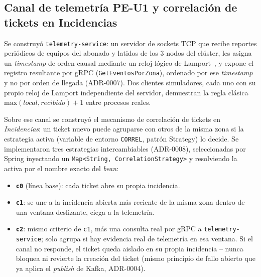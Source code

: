 \subsection{Canal de telemetría PE-U1 y correlación de tickets en Incidencias}
\label{sec:pe-u1-correl}

Se construyó \texttt{telemetry-service}: un servidor de sockets TCP que recibe reportes
periódicos de equipos del abonado y latidos de los 3 nodos del clúster, les asigna un
\emph{timestamp} de orden causal mediante un reloj lógico de Lamport~\cite{lamport1978time}, y
expone el registro resultante por gRPC (\texttt{GetEventosPorZona}), ordenado por ese
\emph{timestamp} y no por orden de llegada (ADR-0007). Dos clientes simuladores, cada uno con su
propio reloj de Lamport independiente del servidor, demuestran la regla clásica
$\text{max}(local, recibido) + 1$ entre procesos reales.

Sobre ese canal se construyó el mecanismo de correlación de tickets en \emph{Incidencias}: un
ticket nuevo puede agruparse con otros de la misma zona si la estrategia activa (variable de
entorno \texttt{CORREL}, patrón Strategy) lo decide. Se implementaron tres estrategias
intercambiables (ADR-0008), seleccionadas por Spring inyectando un
\texttt{Map<String, CorrelationStrategy>} y resolviendo la activa por el nombre exacto del
\emph{bean}:

\begin{itemize}[nosep]
  \item \textbf{\texttt{c0}} (línea base): cada ticket abre su propia incidencia.
  \item \textbf{\texttt{c1}}: se une a la incidencia abierta más reciente de la misma zona dentro
        de una ventana deslizante, ciega a la telemetría.
  \item \textbf{\texttt{c2}}: mismo criterio de \texttt{c1}, más una consulta real por gRPC a
        \texttt{telemetry-service}; solo agrupa si hay evidencia real de telemetría en esa
        ventana. Si el canal no responde, el ticket queda aislado en su propia incidencia --
        nunca bloquea ni revierte la creación del ticket (mismo principio de fallo abierto que
        ya aplica el \emph{publish} de Kafka, ADR-0004).
\end{itemize}

